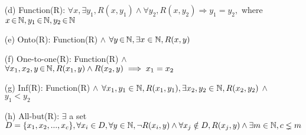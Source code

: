 \documentclass[12pt]{article}
\begin{document}
\begin{enumerate}
\item[(d)] Function(R): $\forall x, \exists y_1, R(x, y_1) \wedge \forall y_2, R(x, y_2) \Rightarrow y_1 = y_2,$ where $x \,{\in}\, \mathbb N, y_1 \,{\in}\, \mathbb N, y_2 \,{\in}\, \mathbb N $
\item[(e)] Onto(R): Function(R) $\land$ $\forall y \,{\in}\, \mathbb N, \exists x \in \mathbb N, R(x, y)$
\item[(f)] One-to-one(R): Function(R) $\land$ $\forall x_1, x_2, y \,{\in}\, \mathbb N, R(x_1, y) \land R(x_2, y) \implies x_1 = x_2$
\item[(g)] Inf(R): Function(R) $\land$ $\forall x_1, y_1 \in \mathbb N, R(x_1, y_1), \exists x_2, y_2 \in \mathbb N, R(x_2, y_2)$ $\land$ $y_1 < y_2$
\item[(h)] All-but(R): $\exists$ a set $D = \{x_1, x_2, ..., x_c \}, \forall x_i \in D, \forall y \in \mathbb N, \neg R(x_i, y) \land \forall x_j \notin D, R(x_j, y) \land \exists m \in \mathbb N, c \lneq m$



\end{enumerate}
\end{document}
